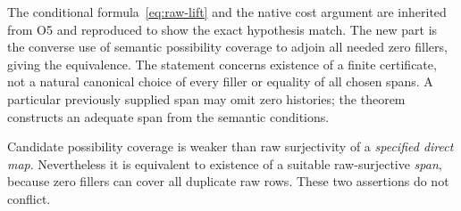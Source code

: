\documentclass[11pt,a4paper]{article}
\theoremstyle{definition}
\begin{document}
The conditional formula~\eqref{eq:raw-lift} and the native cost argument
are inherited from O5 and reproduced to show the exact hypothesis match.
The new part is the converse use of semantic possibility coverage to
adjoin all needed zero fillers, giving the equivalence. The statement
concerns existence of a finite certificate, not a natural canonical
choice of every filler or equality of all chosen spans. A particular
previously supplied span may omit zero histories; the theorem constructs
an adequate span from the semantic conditions.

Candidate possibility coverage is weaker than raw surjectivity of a
\emph{specified direct map}. Nevertheless it is equivalent to existence
of a suitable raw-surjective \emph{span}, because zero fillers can cover
all duplicate raw rows. These two assertions do not conflict.
\end{document}
